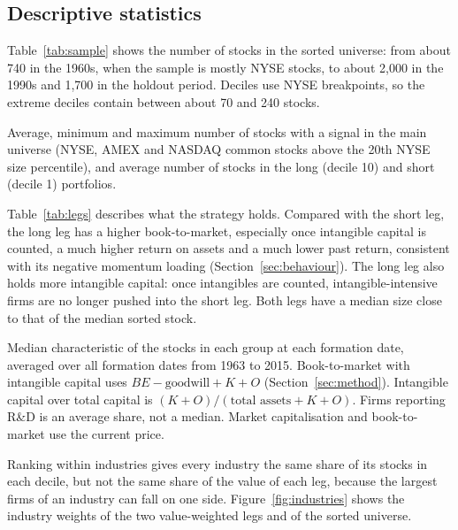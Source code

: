 \documentclass[12pt,a4paper]{article}
\newcommand{\tablenote}[1]{\par\vspace{4pt}\begin{minipage}{\linewidth}\footnotesize\singlespacing #1\end{minipage}}
\begin{document}
\subsection{Descriptive statistics}

Table~\ref{tab:sample} shows the number of stocks in the sorted universe: from about 740 in the
1960s, when the sample is mostly NYSE stocks, to about 2,000 in the 1990s and 1,700 in the holdout
period. Deciles use NYSE breakpoints, so the extreme deciles contain between about 70 and 240 stocks.

\begin{table}[H]
\centering
\caption{Sample: number of stocks sorted each month}\label{tab:sample}

\tablenote{Average, minimum and maximum number of stocks with a signal in the main universe (NYSE,
AMEX and NASDAQ common stocks above the 20th NYSE size percentile), and average number of stocks in
the long (decile 10) and short (decile 1) portfolios.}
\end{table}

Table~\ref{tab:legs} describes what the strategy holds. Compared with the short leg, the long leg
has a higher book-to-market, especially once intangible capital is counted, a much higher return on
assets and a much lower past return, consistent with its negative momentum loading
(Section~\ref{sec:behaviour}). The long leg also holds more intangible capital: once intangibles are
counted, intangible-intensive firms are no longer pushed into the short leg. Both legs have a median
size close to that of the median sorted stock.

\begin{table}[H]
\centering
\caption{Characteristics of the long and short portfolios, 1963--2015}\label{tab:legs}
\resizebox{\textwidth}{!}{}
\tablenote{Median characteristic of the stocks in each group at each formation date, averaged over all
formation dates from 1963 to 2015. Book-to-market with intangible capital uses $BE - \text{goodwill} +
K + O$ (Section~\ref{sec:method}). Intangible capital over total capital is $(K+O)/(\text{total
assets}+K+O)$. Firms reporting R\&D is an average share, not a median. Market capitalisation and
book-to-market use the current price.}
\end{table}

Ranking within industries gives every industry the same share of its stocks in each decile, but not
the same share of the value of each leg, because the largest firms of an industry can fall on one
side. Figure~\ref{fig:industries} shows the industry weights of the two value-weighted legs and of the
sorted universe.
\end{document}
